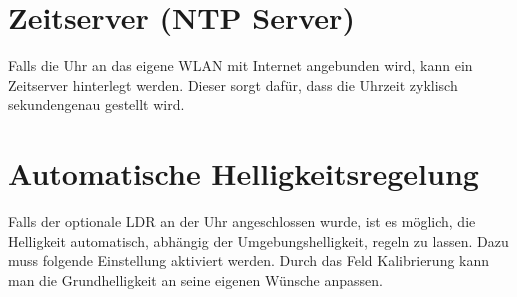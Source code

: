 \documentclass[12pt,a4paper, german,oneside, headinclude, headsepline,plainheadsepline,BCOR20mm, DIV18,parskip=half, openright, numbers=noenddot, captions=tableheading,version=first,listof=totoc,version=first]{scrbook}
\begin{document}
\section{Zeitserver (NTP Server)}
Falls die Uhr an das eigene WLAN mit Internet angebunden wird, kann ein Zeitserver hinterlegt werden. Dieser sorgt dafür, dass die Uhrzeit zyklisch sekundengenau gestellt wird. 
 
\section{Automatische Helligkeitsregelung}
Falls der optionale LDR an der Uhr angeschlossen wurde, ist es möglich, die Helligkeit automatisch, abhängig der Umgebungshelligkeit, regeln zu lassen. Dazu muss folgende Einstellung aktiviert werden. Durch das Feld Kalibrierung kann man die Grundhelligkeit an seine eigenen Wünsche anpassen.
\end{document}
